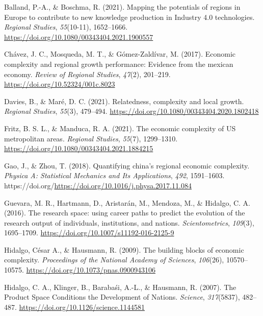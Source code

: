 \documentclass[
]{agujournal2019}
\newlength{\cslhangindent}
\newenvironment{CSLReferences}[2] %
 {\begin{list}{}{%
  \setlength{\itemindent}{0pt}
  \setlength{\leftmargin}{0pt}
  \setlength{\parsep}{0pt}
  \ifodd #1
   \setlength{\leftmargin}{\cslhangindent}
   \setlength{\itemindent}{-1\cslhangindent}
  \fi
  \setlength{\itemsep}{#2\baselineskip}}}
 {\end{list}}
\begin{document}
\label{refs}
\begin{CSLReferences}{1}{0}
\vspace{1em}

Balland, P.-A., \& Boschma, R. (2021). Mapping the potentials of regions
in Europe to contribute to new knowledge production in Industry 4.0
technologies. \emph{Regional Studies}, \emph{55}(10-11), 1652--1666.
\url{https://doi.org/10.1080/00343404.2021.1900557}

Chávez, J. C., Mosqueda, M. T., \& Gómez-Zaldívar, M. (2017). Economic
complexity and regional growth performance: Evidence from the mexican
economy. \emph{Review of Regional Studies}, \emph{47}(2), 201--219.
\url{https://doi.org/10.52324/001c.8023}

Davies, B., \& Maré, D. C. (2021). Relatedness, complexity and local
growth. \emph{Regional Studies}, \emph{55}(3), 479--494.
\url{https://doi.org/10.1080/00343404.2020.1802418}

Fritz, B. S. L., \& Manduca, R. A. (2021). The economic complexity of US
metropolitan areas. \emph{Regional Studies}, \emph{55}(7), 1299--1310.
\url{https://doi.org/10.1080/00343404.2021.1884215}

Gao, J., \& Zhou, T. (2018). Quantifying china's regional economic
complexity. \emph{Physica A: Statistical Mechanics and Its
Applications}, \emph{492}, 1591--1603.
https://doi.org/\url{https://doi.org/10.1016/j.physa.2017.11.084}

Guevara, M. R., Hartmann, D., Aristarán, M., Mendoza, M., \& Hidalgo, C.
A. (2016). The research space: using career paths to predict the
evolution of the research output of individuals, institutions, and
nations. \emph{Scientometrics}, \emph{109}(3), 1695--1709.
\url{https://doi.org/10.1007/s11192-016-2125-9}

Hidalgo, César A., \& Hausmann, R. (2009). The building blocks of
economic complexity. \emph{Proceedings of the National Academy of
Sciences}, \emph{106}(26), 10570--10575.
\url{https://doi.org/10.1073/pnas.0900943106}

Hidalgo, C. A., Klinger, B., Barabaśi, A.-L., \& Hausmann, R. (2007).
The Product Space Conditions the Development of Nations. \emph{Science},
\emph{317}(5837), 482--487.
\url{https://doi.org/10.1126/science.1144581}


\end{CSLReferences}
\end{document}
